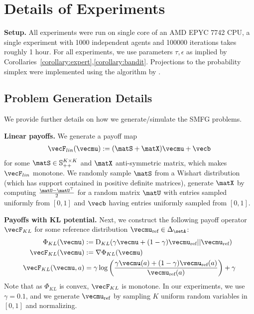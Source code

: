
\section{Details of Experiments}\label{sec:experiments_detailed}

\textbf{Setup.}
All experiments were run on single core of an AMD EPYC 7742 CPU, a single experiment with 1000 independent agents and 100000 iterations takes roughly 1 hour.
For all experiments, we use parameters $\tau, \epsilon$ as implied by Corollaries~\ref{corollary:expert},\ref{corollary:bandit}.
Projections to the probability simplex were implemented using the algorithm by \cite{duchi2008efficient}.

\subsection{Problem Generation Details}

We provide further details on how we generate/simulate the SMFG problems.

\textbf{Linear payoffs.}
We generate a payoff map
\begin{align*}
    \vecF_{lin}(\vecmu) := (\matS + \matX) \vecmu + \vecb
\end{align*}
for some $\matS \in \mathbb{S}_{++}^{K\times K}$ and $\matX$ anti-symmetric matrix, which makes $ \vecF_{lin}$ monotone.
We randomly sample $\matS$ from a Wishart distribution (which has support contained in positive definite matrices), generate $\matX$ by computing $\frac{\matU - \matU^\top}{2}$ for a random matrix $\matU$ with entries sampled uniformly from $[0,1]$ and $\vecb$ having entries uniformly sampled from $[0,1]$.

\textbf{Payoffs with KL potential.}
Next, we construct the following payoff operator $\vecF_{KL}$ for some reference distribution $\vecmu_{\text{ref}} \in \Delta_\setA$:
\begin{align*}
    \Phi_{KL}(\vecmu) &:= \operatorname{D}_{KL}(\gamma\vecmu + (1-\gamma)\vecmu_{\text{ref}}||\vecmu_{\text{ref}}) \\
    \vecF_{KL}(\vecmu) &:= \nabla \Phi_{KL} (\vecmu) \\
        \vecF_{KL}(\vecmu, a) &= \gamma \log\left(\frac{\gamma \vecmu(a) + (1-\gamma) \vecmu_{\text{ref}}(a)}{\vecmu_{\text{ref}}(a)}\right) + \gamma
\end{align*}
Note that as $\Phi_{KL}$ is convex, $\vecF_{KL}$ is monotone.
In our experiments, we use $\gamma = 0.1$, and we generate $\vecmu_{\text{ref}}$ by sampling $K$ uniform random variables in $[0,1]$ and normalizing.


